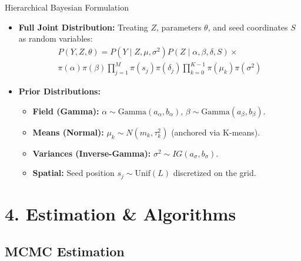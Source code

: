 \documentclass[
  ignorenonframetext,
]{beamer}
\providecommand{\tightlist}{%
  \setlength{\itemsep}{0pt}\setlength{\parskip}{0pt}}\usepackage{longtable,booktabs,array}
\begin{document}
\begin{frame}{Hierarchical Bayesian Formulation}
\label{hierarchical-bayesian-formulation}
\begin{itemize}
\item
  \textbf{Full Joint Distribution:} Treating \(Z\), parameters
  \(\theta\), and seed coordinates \(S\) as random variables: \[
  \begin{aligned}
  P(Y, Z, \theta) = P(Y \mid Z, \mu, \sigma^2) P(Z \mid \alpha, \beta, \delta, S) \times  \\
  \pi(\alpha)\pi(\beta)\prod_{j=1}^M \pi(s_j)\pi(\delta_j)
  \prod_{k=0}^{K-1} \pi(\mu_k)\pi(\sigma^2)
  \end{aligned}
  \]
\item
  \textbf{Prior Distributions:}

  \begin{itemize}
  \tightlist
  \item
    \textbf{Field (Gamma):}
    \(\alpha \sim \text{Gamma}(a_\alpha, b_\alpha)\),
    \(\beta \sim \text{Gamma}(a_\beta, b_\beta)\).
  \item
    \textbf{Means (Normal):} \(\mu_k \sim N(m_k, \tau^2_k)\) (anchored
    via K-means).
  \item
    \textbf{Variances (Inverse-Gamma):}
    \(\sigma^2 \sim IG(a_\sigma, b_\sigma)\).
  \item
    \textbf{Spatial:} Seed position \(s_j \sim \text{Unif}(L)\)
    discretized on the grid.
  \end{itemize}
\end{itemize}
\end{frame}

\section{4. Estimation \& Algorithms}\label{estimation-algorithms}

\subsection{MCMC Estimation}\label{mcmc-estimation}
\end{document}
